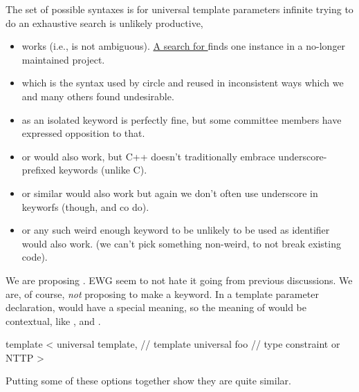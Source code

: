 \documentclass{wg21}
\begin{document}
The set of possible syntaxes is for universal template parameters infinite trying to do an exhaustive search is unlikely productive,

\begin{itemize}

\item {} works (i.e., is not ambiguous). \href{https://tinyurl.com/pth8v9p7}{A search for }
finds one instance in a no-longer maintained project.

\item {} which is the syntax used by circle and  reused  in inconsistent ways
which we and many others found undesirable.

\item {} as an isolated keyword is perfectly fine, but some committee members have expressed opposition to that.

\item {} or  would also work, but C++ doesn't traditionally embrace underscore-prefixed keywords (unlike C).

\item {} or similar would also work but again we don't often use underscore in keyworfs (though,  and co do).

\item {} or any such weird enough keyword to be unlikely to be used as identifier would also work. (we can't pick something non-weird, to not break existing code).

\end{itemize}

We are proposing . EWG seem to not hate it going from previous discussions.
We are, of course, \emph{not} proposing to make  a keyword.
In a template parameter declaration,  would have a special meaning, so the meaning of  would be
contextual, like ,  and .


\begin{colorblock}
template <
        universal template, // template
        universal foo       // type constraint or NTTP
>
\end{colorblock}

Putting some of these options together show they are quite similar.
\end{document}

